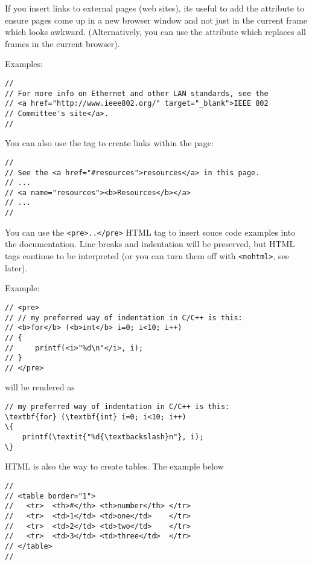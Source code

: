If you insert links to external pages (web sites), its useful to add
the  attribute to ensure pages come up in a new
browser window and not just in the current frame which looks awkward.
(Alternatively, you can use the  attribute
which replaces all frames in the current browser).

Examples:

\begin{verbatim}
//
// For more info on Ethernet and other LAN standards, see the
// <a href="http://www.ieee802.org/" target="_blank">IEEE 802
// Committee's site</a>.
//
\end{verbatim}

You can also use the  tag to create links within the page:

\begin{verbatim}
//
// See the <a href="#resources">resources</a> in this page.
// ...
// <a name="resources"><b>Resources</b></a>
// ...
//
\end{verbatim}

You can use the \texttt{<pre>..</pre>} HTML tag to insert souce code examples
into the documentation. Line breaks and indentation will be preserved,
but HTML tags continue to be interpreted (or you can turn them off
with \texttt{<nohtml>}, see later).

Example:

\begin{verbatim}
// <pre>
// // my preferred way of indentation in C/C++ is this:
// <b>for</b> (<b>int</b> i=0; i<10; i++)
// {
//     printf(<i>"%d\n"</i>, i);
// }
// </pre>
\end{verbatim}

will be rendered as

\begin{Verbatim}[commandchars=\\\{\}]
// my preferred way of indentation in C/C++ is this:
\textbf{for} (\textbf{int} i=0; i<10; i++)
\{
    printf(\textit{"%d{\textbackslash}n"}, i);
\}
\end{Verbatim}

HTML is also the way to create tables. The example below

\begin{verbatim}
//
// <table border="1">
//   <tr>  <th>#</th> <th>number</th> </tr>
//   <tr>  <td>1</td> <td>one</td>    </tr>
//   <tr>  <td>2</td> <td>two</td>    </tr>
//   <tr>  <td>3</td> <td>three</td>  </tr>
// </table>
//
\end{verbatim}

